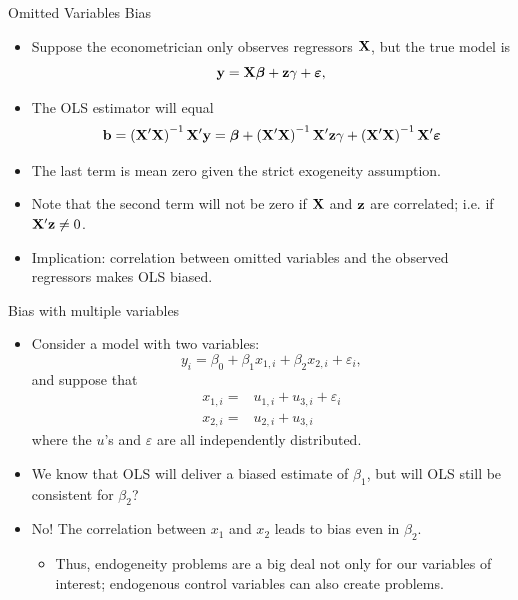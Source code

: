 \begin{frame}{Omitted Variables Bias}
\begin{itemize}
	\item Suppose the econometrician only observes regressors ${\bf X} $, but the true model is\[
			{\bf y}= {\bf X} \boldsymbol{\beta} + {\bf z} \gamma + \boldsymbol{\varepsilon},
	\]

	\item The OLS estimator will equal\[
	{\bf b} = \left({\bf X}'{\bf X}\right)^{-1} {\bf X}' {\bf y} = \boldsymbol{\beta}  + \left({\bf X}'{\bf X}\right)^{-1} {\bf X}' {\bf z} \gamma + \left({\bf X}'{\bf X}\right)^{-1} {\bf X}' \boldsymbol{\varepsilon}
	\]

	\item The last term is mean zero given the strict exogeneity assumption.

	\item Note that the second term will not be zero if ${\bf X}$ and ${\bf z}$ are correlated;
	i.e. if $ {\bf X}' {\bf z} \ne 0$.

	\item Implication:  correlation between omitted variables and the observed regressors makes OLS biased.

	
\end{itemize}
\end{frame}







\begin{frame}{Bias with multiple variables}
\begin{itemize}
		\item<1-> Consider a model with two variables:\[
			y_i = \beta_0 + \beta_1 x_{1,i} + \beta_2 x_{2,i} + \varepsilon_i,
		\]
		and suppose that
		\begin{align*}
			x_{1,i} =& u_{1,i} + u_{3,i} + \varepsilon_i  \\
			x_{2,i} =& u_{2,i} + u_{3,i}
		\end{align*}		
		where the $u$'s and $\varepsilon$ are all independently distributed. 
		
		\item<1-> We know that OLS will deliver
		a biased estimate of $\beta_{1}$, but will OLS still be consistent for $\beta_2$?
		
		\medskip
		\item<2-> No! The correlation between $x_1$ and $x_2$ leads to bias even
		in $\beta_2$.
		\begin{itemize}
			\item<2-> Thus, endogeneity problems are a big deal not only for our variables of interest; endogenous
			control variables can also create problems.
		\end{itemize}
\end{itemize}
\end{frame}


